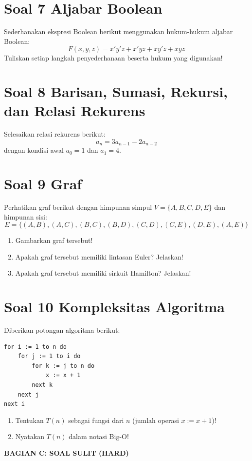 \documentclass[12pt,a4paper]{article}
\begin{document}
\section*{Soal 7 Aljabar Boolean}
Sederhanakan ekspresi Boolean berikut menggunakan hukum-hukum aljabar Boolean:
$$F(x,y,z) = x'y'z + x'yz + xy'z + xyz$$
Tuliskan setiap langkah penyederhanaan beserta hukum yang digunakan!

\section*{Soal 8 Barisan, Sumasi, Rekursi, dan Relasi Rekurens}
Selesaikan relasi rekurens berikut:
$$a_n = 3a_{n-1} - 2a_{n-2}$$
dengan kondisi awal $a_0 = 1$ dan $a_1 = 4$.

\section*{Soal 9 Graf}
Perhatikan graf berikut dengan himpunan simpul $V = \{A, B, C, D, E\}$ dan himpunan sisi:
$$E = \{(A,B), (A,C), (B,C), (B,D), (C,D), (C,E), (D,E), (A,E)\}$$
\begin{enumerate}[label=(\alph*)]
    \item Gambarkan graf tersebut!
    \item Apakah graf tersebut memiliki lintasan Euler? Jelaskan!
    \item Apakah graf tersebut memiliki sirkuit Hamilton? Jelaskan!
\end{enumerate}

\section*{Soal 10 Kompleksitas Algoritma}
Diberikan potongan algoritma berikut:
\begin{verbatim}
for i := 1 to n do
    for j := 1 to i do
        for k := j to n do
            x := x + 1
        next k
    next j
next i
\end{verbatim}
\begin{enumerate}[label=(\alph*)]
    \item Tentukan $T(n)$ sebagai fungsi dari $n$ (jumlah operasi $x := x + 1$)!
    \item Nyatakan $T(n)$ dalam notasi Big-O!
\end{enumerate}

\newpage
\begin{center}
\large \textbf{BAGIAN C: SOAL SULIT (HARD)}
\end{center}
\end{document}
